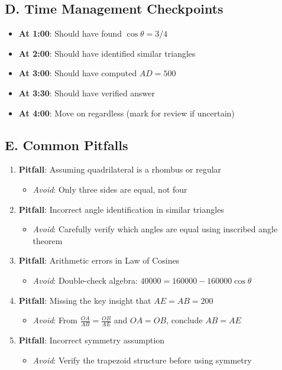 \documentclass[12pt]{article}
\begin{document}
\begin{roadmapbox}
\subsection*{D. Time Management Checkpoints}
\begin{itemize}[leftmargin=*]
    \item \textbf{At 1:00}: Should have found $\cos\theta = 3/4$
    \item \textbf{At 2:00}: Should have identified similar triangles
    \item \textbf{At 3:00}: Should have computed $AD = 500$
    \item \textbf{At 3:30}: Should have verified answer
    \item \textbf{At 4:00}: Move on regardless (mark for review if uncertain)
\end{itemize}

\subsection*{E. Common Pitfalls}
\begin{enumerate}[leftmargin=*]
    \item \textbf{Pitfall}: Assuming quadrilateral is a rhombus or regular
    \begin{itemize}
        \item \textit{Avoid}: Only three sides are equal, not four
    \end{itemize}
    
    \item \textbf{Pitfall}: Incorrect angle identification in similar triangles
    \begin{itemize}
        \item \textit{Avoid}: Carefully verify which angles are equal using inscribed angle theorem
    \end{itemize}
    
    \item \textbf{Pitfall}: Arithmetic errors in Law of Cosines
    \begin{itemize}
        \item \textit{Avoid}: Double-check algebra: $40000 = 160000 - 160000\cos\theta$
    \end{itemize}
    
    \item \textbf{Pitfall}: Missing the key insight that $AE = AB = 200$
    \begin{itemize}
        \item \textit{Avoid}: From $\frac{OA}{AB} = \frac{OB}{AE}$ and $OA = OB$, conclude $AB = AE$
    \end{itemize}
    
    \item \textbf{Pitfall}: Incorrect symmetry assumption
    \begin{itemize}
        \item \textit{Avoid}: Verify the trapezoid structure before using symmetry
    \end{itemize}
\end{enumerate}
\end{roadmapbox}
\end{document}
